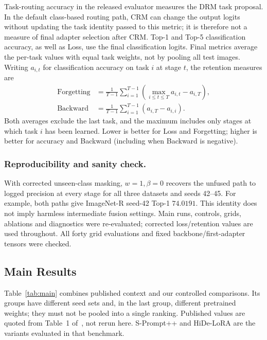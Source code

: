 \documentclass[runningheads]{llncs}
\begin{document}
Task-routing accuracy in the released evaluator measures the DRM task proposal. In the
default class-based routing path, CRM can change the output logits without
updating the task identity passed to this metric; it is therefore not a measure
of final adapter selection after CRM. Top-1 and Top-5 classification accuracy,
as well as Loss, use the final
classification logits. Final metrics average the per-task values with equal
task weights, not by pooling all test images. Writing $a_{i,t}$ for classification accuracy on task $i$
at stage $t$, the retention measures are
\begin{align}
\mathrm{Forgetting}
 &= \frac{1}{T-1}\sum_{i=1}^{T-1}
 \left(\max_{i\le t\le T} a_{i,t}-a_{i,T}\right),\\
\mathrm{Backward}
 &= \frac{1}{T-1}\sum_{i=1}^{T-1}(a_{i,T}-a_{i,i}).
\label{eq:metrics}
\end{align}
Both averages exclude the last task, and the maximum includes only stages at
which task $i$ has been learned. Lower is better for Loss and Forgetting;
higher is better for accuracy and Backward (including when Backward is negative).

\subsubsection{Reproducibility and sanity check.}
With corrected unseen-class masking, $w=1,\beta=0$ recovers the unfused path
to logged precision at every stage for all three datasets and seeds 42--45.
For example, both paths give ImageNet-R seed-42 Top-1 $74.0191$.
This identity does not imply harmless intermediate fusion settings.
Main runs, controls, grids, ablations and diagnostics were re-evaluated;
corrected loss/retention values are used throughout. All forty grid evaluations
and fixed backbone/first-adapter tensors were checked.

\subsection{Main Results}
\label{sec:results}

Table~\ref{tab:main} combines published context and our controlled comparisons.
Its groups have different seed sets and, in the last group, different pretrained
weights; they must not be pooled into a single ranking. Published values are
quoted from Table~1 of~\cite{ref_hrmpet}, not rerun here. S-Prompt++ and HiDe-LoRA
are the variants evaluated in that benchmark.
\end{document}
